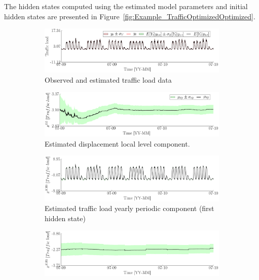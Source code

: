 The hidden states computed using the estimated model parameters and initial hidden states are presented in Figure~\ref{fig:Example_TrafficOptimizedOptimized}.





\begin{figure}[h!]
\begin{center}
\begin{subfigure}{\linewidth}
\includegraphics[width=0.9\linewidth]{./docfigs/Example_TRAFFIC/optim_param_optim_initialhiddenstate/TrafficLoad_ObservedPredicted.pdf} 
\caption{Observed and estimated traffic load data}
\end{subfigure}
\begin{subfigure}{\linewidth}
\includegraphics[width=0.9\linewidth]{./docfigs/Example_TRAFFIC/optim_param_optim_initialhiddenstate/TrafficLoad_LL_1.pdf}
\caption{Estimated displacement local level component.}
\end{subfigure}
\begin{subfigure}{\linewidth}
\includegraphics[width=0.9\linewidth]{./docfigs/Example_TRAFFIC/optim_param_optim_initialhiddenstate/TrafficLoad_KR0_2.pdf} 
\caption{Estimated traffic load yearly periodic component (first hidden state)}
\end{subfigure}
\begin{subfigure}{\linewidth}
\includegraphics[width=0.9\linewidth]{./docfigs/Example_TRAFFIC/optim_param_optim_initialhiddenstate/TrafficLoad_KR1_3.pdf}

\end{subfigure}
\end{center}
\end{figure}
